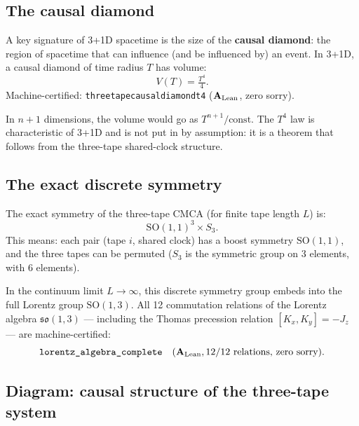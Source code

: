 \documentclass[11pt,a4paper]{article}
\newcommand{\term}[1]{\textbf{#1}}
\newcommand{\lean}[1]{%
  \penalty-100
  \begingroup\def\_{\textunderscore\allowbreak}\texttt{#1}\endgroup}
\newcommand{\CatAL}{\ensuremath{\mathbf{A}_{\rm Lean}}}
\begin{document}
\subsection{The causal diamond}

A key signature of 3+1D spacetime is the size of the \term{causal diamond}:
the region of spacetime that can influence (and be influenced by) an event.
In 3+1D, a causal diamond of time radius $T$ has volume:
\[
  V(T) = \tfrac{T^4}{4}.
\]
Machine-certified: \lean{three\_tape\_causal\_diamond\_t4} (\CatAL, zero sorry).

In $n+1$ dimensions, the volume would go as $T^{n+1}/\text{const}$.
The $T^4$ law is characteristic of 3+1D and is not put in by assumption:
it is a theorem that follows from the three-tape shared-clock structure.

\subsection{The exact discrete symmetry}

The exact symmetry of the three-tape CMCA (for finite tape length $L$) is:
\[
  \mathrm{SO}(1,1)^3 \times S_3.
\]
This means: each pair (tape $i$, shared clock) has a boost symmetry
$\mathrm{SO}(1,1)$, and the three tapes can be permuted ($S_3$ is the
symmetric group on 3 elements, with 6 elements).

In the continuum limit $L \to \infty$, this discrete symmetry group
embeds into the full Lorentz group $\mathrm{SO}(1,3)$.
All 12 commutation relations of the Lorentz algebra
$\mathfrak{so}(1,3)$ --- including the Thomas precession relation
$[K_x, K_y] = -J_z$ --- are machine-certified:
\[
  \lean{lorentz\_algebra\_complete} \quad (\CatAL, \text{12/12 relations, zero sorry}).
\]

\subsection{Diagram: causal structure of the three-tape system}
\end{document}
